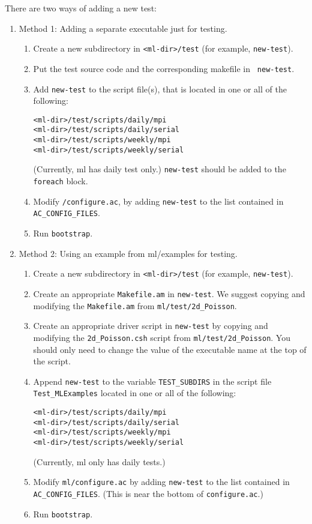 \documentclass[10pt,letter,relax]{SANDreport}
\newcommand{\ML}     {{\sc ml }}
\begin{document}
There are two ways of adding a new test:
\begin{enumerate}
\item Method 1: Adding a separate executable just for testing.
\begin{enumerate}
\item Create a new subdirectory in \verb!<ml-dir>/test! (for example,
  {\tt new-test}).
\item Put the test source code and the corresponding makefile in {\tt
    new-test}.
\item Add {\tt new-test} to the script file(s), that is located in one or all
of the following:
\begin{verbatim}
<ml-dir>/test/scripts/daily/mpi
<ml-dir>/test/scripts/daily/serial
<ml-dir>/test/scripts/weekly/mpi
<ml-dir>/test/scripts/weekly/serial
\end{verbatim}
(Currently, \ML has daily test only.) {\tt new-test} should be added to
the {\tt foreach} block.
\item Modify {\tt <ml-dir>/configure.ac}, by adding {\tt new-test} to
  the list contained in {\tt AC\_CONFIG\_FILES}.
\item Run {\tt bootstrap}.
\end{enumerate}
\item Method 2: Using an example from ml/examples for testing.
\begin{enumerate}
\item Create a new subdirectory in \verb!<ml-dir>/test! (for example,
  {\tt new-test}).
\item Create an appropriate \verb!Makefile.am! in {\tt new-test}.
We suggest copying and modifying the \verb!Makefile.am! from
\verb!ml/test/2d_Poisson!.
\item Create an appropriate driver script in {\tt new-test} by
copying and modifying the \verb!2d_Poisson.csh! script from
\verb!ml/test/2d_Poisson!.
You should only need to change the value of the executable name at the top
of the script.
\item Append {\tt new-test} to the variable {\tt TEST\_SUBDIRS} in the script
 file \verb!Test_MLExamples! located in one or all of the following:
\begin{verbatim}
<ml-dir>/test/scripts/daily/mpi
<ml-dir>/test/scripts/daily/serial
<ml-dir>/test/scripts/weekly/mpi
<ml-dir>/test/scripts/weekly/serial
\end{verbatim}
(Currently, \ML only has daily tests.)
\item Modify {\tt ml/configure.ac} by adding {\tt new-test} to
  the list contained in {\tt AC\_CONFIG\_FILES}.  (This is near the bottom
  of {\tt configure.ac}.)
\item Run {\tt bootstrap}.
\end{enumerate}
\end{enumerate}
\end{document}
